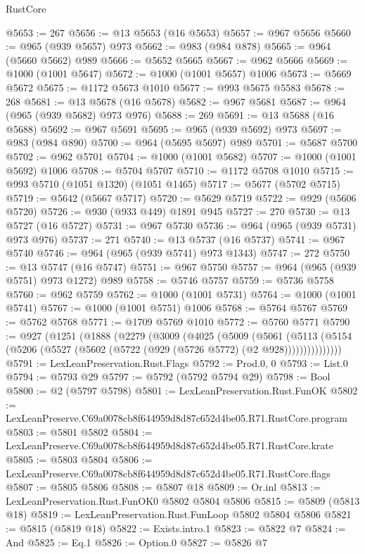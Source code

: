 \begin{lexlean}{RustCore}
\begin{coremodule}
@5653 := 267
@5656 := @13 @5653 (@16 @5653)
@5657 := @967 @5656
@5660 := @965 (@939 @5657) @973
@5662 := @983 (@984 @878)
@5665 := @964 (@5660 @5662) @989
@5666 := @5652 @5665
@5667 := @962 @5666
@5669 := @1000 (@1001 @5647)
@5672 := @1000 (@1001 @5657) @1006
@5673 := @5669 @5672
@5675 := @1172 @5673 @1010
@5677 := @993 @5675 @5583
@5678 := 268
@5681 := @13 @5678 (@16 @5678)
@5682 := @967 @5681
@5687 := @964 (@965 (@939 @5682) @973 @976)
@5688 := 269
@5691 := @13 @5688 (@16 @5688)
@5692 := @967 @5691
@5695 := @965 (@939 @5692) @973
@5697 := @983 (@984 @890)
@5700 := @964 (@5695 @5697) @989
@5701 := @5687 @5700
@5702 := @962 @5701
@5704 := @1000 (@1001 @5682)
@5707 := @1000 (@1001 @5692) @1006
@5708 := @5704 @5707
@5710 := @1172 @5708 @1010
@5715 := @993 @5710 (@1051 @1320) (@1051 @1465)
@5717 := @5677 (@5702 @5715)
@5719 := @5642 (@5667 @5717)
@5720 := @5629 @5719
@5722 := @929 (@5606 @5720)
@5726 := @930 (@933 @449) @1891 @945
@5727 := 270
@5730 := @13 @5727 (@16 @5727)
@5731 := @967 @5730
@5736 := @964 (@965 (@939 @5731) @973 @976)
@5737 := 271
@5740 := @13 @5737 (@16 @5737)
@5741 := @967 @5740
@5746 := @964 (@965 (@939 @5741) @973 @1343)
@5747 := 272
@5750 := @13 @5747 (@16 @5747)
@5751 := @967 @5750
@5757 := @964 (@965 (@939 @5751) @973 @1272) @989
@5758 := @5746 @5757
@5759 := @5736 @5758
@5760 := @962 @5759
@5762 := @1000 (@1001 @5731)
@5764 := @1000 (@1001 @5741)
@5767 := @1000 (@1001 @5751) @1006
@5768 := @5764 @5767
@5769 := @5762 @5768
@5771 := @1709 @5769 @1010
@5772 := @5760 @5771
@5790 := @927
    (@1251
      (@1888
        (@2279
          (@3009
            (@4025
              (@5009
                (@5061
                  (@5113
                    (@5154 (@5206 (@5527 (@5602 (@5722 (@929 (@5726 @5772) (@2 @928)))))))))))))))
@5791 := LexLeanPreservation.Rust.Flags
@5792 := Prod.{0, 0}
@5793 := List.{0}
@5794 := @5793 @29
@5797 := @5792 (@5792 @5794 @29)
@5798 := Bool
@5800 := @2 (@5797 @5798)
@5801 := LexLeanPreservation.Rust.FunOK
@5802 := LexLeanPreserve.C69a0078cb8f644959d8d87c652d4be05.R71.RustCore.program
@5803 := @5801 @5802
@5804 := LexLeanPreserve.C69a0078cb8f644959d8d87c652d4be05.R71.RustCore.krate
@5805 := @5803 @5804
@5806 := LexLeanPreserve.C69a0078cb8f644959d8d87c652d4be05.R71.RustCore.flags
@5807 := @5805 @5806
@5808 := @5807 @18
@5809 := Or.inl
@5813 := LexLeanPreservation.Rust.FunOK0 @5802 @5804 @5806
@5815 := @5809 (@5813 @18)
@5819 := LexLeanPreservation.Rust.FunLoop @5802 @5804 @5806
@5821 := @5815 (@5819 @18)
@5822 := Exists.intro.{1}
@5823 := @5822 @7
@5824 := And
@5825 := Eq.{1}
@5826 := Option.{0}
@5827 := @5826 @7

\end{coremodule}
\end{lexlean}
